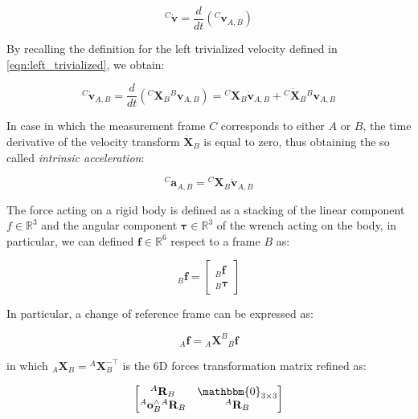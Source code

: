 \begin{equation}
    {}^C\dot{\mathbf{v}} = \frac{d}{dt}\left( {}^C \mathbf{v}_{A,B}\right)
\end{equation}

By recalling the definition for the left trivialized velocity defined in \cref{eqn:left_trivialized}, we obtain:

\begin{equation}
    {}^C\dot{\mathbf{v}} _{A,B} = \frac{d}{dt} \left({}^C \mathbf{X}_B {}^B\mathbf{v}_{A,B} \right) = {}^C \mathbf{X}_B \dot{\mathbf{v}}_{A,B} + {}^C \dot{\mathbf{X}}_B {}^B\mathbf{v}_{A,B}
\end{equation}

In case in which the measurement frame $C$ corresponds to either $A$ or $B$, the time derivative of the velocity transform $\dot{\mathbf{X}}_B$ is equal to zero, thus obtaining the so called \textit{intrinsic acceleration}:

\begin{equation}
    {}^C\mathbf{a}_{A,B} = {}^C \mathbf{X}_B \dot{\mathbf{v}}_{A,B}
\end{equation}

The force acting on a rigid body is defined as a stacking of the linear component $f \in \mathbb{R}^3$ and the angular component $\boldsymbol{\tau} \in \mathbb{R}^3$ of the wrench acting on the body, in particular, we can defined $\mathbf{f} \in \mathbb{R}^6$ respect to a frame $B$ as:

\begin{equation}
    {}_{B}\mathbf{f} = \begin{bmatrix}
        {}_{B}\boldsymbol{f} \\
        {}_{B}\boldsymbol{\tau}
    \end{bmatrix}
\end{equation}

In particular, a change of reference frame can be expressed as:

\begin{equation}
    {}_{A}\mathbf{f} = {}_{A}\mathbf{X}^B {}_{B}\mathbf{f}
\end{equation}

in which ${}_{A}\mathbf{X}_B = {}^A\mathbf{X}_B ^{-\top}$ is the $6$D forces transformation matrix refined as:

\begin{equation}
    \begin{bmatrix}
        {}^A\mathbf{R}_B                         & \mathbbm{0}_{3 \times 3} \\
        {}^A\mathbf{o}_B^\wedge {}^A\mathbf{R}_B & {}^A\mathbf{R}_B
    \end{bmatrix}
\end{equation}

